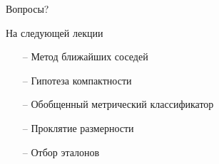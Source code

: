 \documentclass[10pt]{beamer}
\begin{document}
\begin{frame}[standout]
  Вопросы?
\end{frame}

\appendix

\begin{frame}{На следующей лекции}
	\begin{itemize}
	  \item[--] Метод ближайших соседей
	  \item[--] Гипотеза компактности
	  \item[--] Обобщенный метрический классификатор
	  \item[--] Проклятие размерности  
	  \item[--] Отбор эталонов     
	\end{itemize}
\end{frame}
\end{document}
